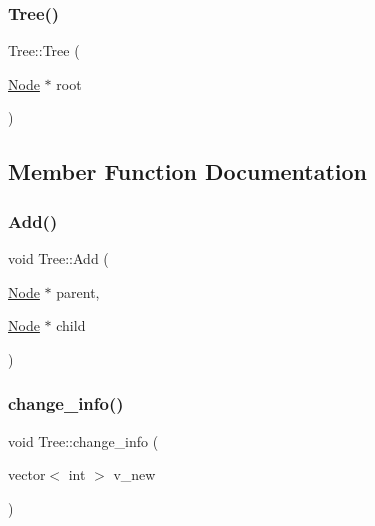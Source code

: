 \mbox{\label{class_tree_ac81e597c6214a8b3ab5bd0c0a1d52c27}} 
\subsubsection{\texorpdfstring{Tree()}{Tree()}\hspace{0.1cm}{\footnotesize\ttfamily [2/2]}}
{\footnotesize\ttfamily Tree\+::\+Tree (\begin{DoxyParamCaption}\item[{\mbox{\hyperlink{class_node}{Node}} $\ast$}]{root }\end{DoxyParamCaption})}



\subsection{Member Function Documentation}
\mbox{\label{class_tree_a2fd711fc3360481e87185a7a70615865}} 
\subsubsection{\texorpdfstring{Add()}{Add()}}
{\footnotesize\ttfamily void Tree\+::\+Add (\begin{DoxyParamCaption}\item[{\mbox{\hyperlink{class_node}{Node}} $\ast$}]{parent,  }\item[{\mbox{\hyperlink{class_node}{Node}} $\ast$}]{child }\end{DoxyParamCaption})}

\mbox{\label{class_tree_a83de2e5a9d0269b1d4a136533b288d19}} 
\subsubsection{\texorpdfstring{change\+\_\+info()}{change\_info()}}
{\footnotesize\ttfamily void Tree\+::change\+\_\+info (\begin{DoxyParamCaption}\item[{vector$<$ int $>$}]{v\+\_\+new }\end{DoxyParamCaption})}

\mbox{\label{class_tree_a95ad032dcc32977751fa60d4715f7c18}} 
